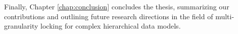  Finally, Chapter \ref{chap:conclusion} concludes the thesis, summarizing our contributions and outlining future research directions in the field of multi-granularity locking for complex hierarchical data models.









